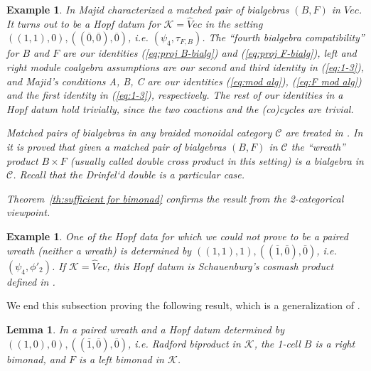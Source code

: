 \documentclass[a4paper, 12pt]{article}
\renewcommand{\_}[1]{\mbox{$_{\left( #1 \right)}$}}
\theoremstyle{plain}
\newtheorem{lma}[thm]{Lemma}
\newtheorem{ex}[thm]{Example}
\newcommand{\C}{{\mathcal C}}
\newcommand{\crta}{\overline}
\def\K{{\mathcal K}}  %
\newcommand{\exlabel}[1]{\label{ex:#1}}
\newcommand{\lelabel}[1]{\label{le:#1}}
\newcommand{\equref}[1]{(\ref{eq:#1})}
\newcommand{\thref}[1]{Theorem~\ref{th:#1}}
\begin{document}
\begin{ex}
In \cite[Proposition 3.12]{Maj5} Majid characterized a {\em matched pair of bialgebras} $(B,F)$ in $Vec$. It turns out to be a Hopf datum for $\K=\hat Vec$ in the 
setting $((1,1),0), ((\crta 0,\crta 0),\crta 0)$, {\em i.e.}  $(\psi_4, \tau_{F,B})$. The ``fourth bialgebra compatibility'' for $B$ and $F$ are our identities 
\equref{proj B-bialg} and \equref{proj F-bialg}, left and right module coalgebra assumptions are our second and third identity in \equref{1-3}, and Majid's conditions 
A, B, C are our identities \equref{mod alg}, \equref{F mod alg} and the first identity in \equref{1-3}, respectively. The rest of our identities in a Hopf datum hold trivially, 
since the two coactions and the (co)cycles are trivial. 

Matched pairs of bialgebras in any braided monoidal category $\C$ are treated in \cite{BD1, ZC, Femic1}. In \cite[Theorem 1.4]{ZC} it is proved that given a 
matched pair of bialgebras $(B,F)$ in $\C$ the ``wreath'' product $B\times F$ (usually called {\em double cross product} in this setting) is a bialgebra in $\C$. 
Recall that the Drinfel`d double is a particular case. 

\thref{sufficient for bimonad} confirms the result from the 2-categorical viewpoint. 
\end{ex}     


\begin{ex} \exlabel{ex 6}
One of the Hopf data for which we could not prove to be a paired wreath (neither a wreath) is determined by $((1,1),1), ((\crta 1,\crta 0),\crta 0)$, {\em i.e.} $(\psi_4, \phi'_2)$. 
If $\K=\hat Vec$, this Hopf datum is Schauenburg's cosmash product defined in \cite[Theorem 5.1]{Sch3}. 
\end{ex}



We end this subsection proving the following result, which is a generalization of \cite[Lemma 5.2]{Femic5}. 

\begin{lma} \lelabel{lambda d.l.}
In a paired wreath and a Hopf datum determined by $((1,0),0), ((\crta 1,\crta 0),\crta 0)$, {\em i.e.} Radford biproduct in $\K$, 
the 1-cell $B$ is a right bimonad, and $F$ is a left bimonad in $\K$. 
\end{lma}
\end{document}

